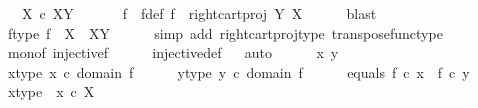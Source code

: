 \begin{isabellebody}
\ \ \ {\isachardoublequoteopen}X\ {\isasymle}\isactrlsub c\ X\isactrlbsup Y\isactrlesup {\isachardoublequoteclose}\isanewline
%
\isadelimproof
%
\endisadelimproof
%
\isatagproof
{}\isamarkupfalse%
\ {\isacharminus}{\kern0pt}\ \isanewline
\ \ \isamarkupfalse%
\ f\ \ f{\isacharunderscore}{\kern0pt}def{\isacharcolon}{\kern0pt}\ {\isachardoublequoteopen}f\ {\isacharequal}{\kern0pt}\ {\isacharparenleft}{\kern0pt}right{\isacharunderscore}{\kern0pt}cart{\isacharunderscore}{\kern0pt}proj\ Y\ X{\isacharparenright}{\kern0pt}\isactrlsup {\isasymsharp}{\isachardoublequoteclose}\isanewline
\ \ \ \ \isamarkupfalse%
\ blast\isanewline
\ \ \isamarkupfalse%
\ \isamarkupfalse%
\ f{\isacharunderscore}{\kern0pt}type{\isacharcolon}{\kern0pt}\ {\isachardoublequoteopen}f\ {\isacharcolon}{\kern0pt}\ X\ {\isasymrightarrow}\ X\isactrlbsup Y\isactrlesup {\isachardoublequoteclose}\isanewline
\ \ \ \ \isamarkupfalse%
\ {\isacharparenleft}{\kern0pt}simp\ add{\isacharcolon}{\kern0pt}\ right{\isacharunderscore}{\kern0pt}cart{\isacharunderscore}{\kern0pt}proj{\isacharunderscore}{\kern0pt}type\ transpose{\isacharunderscore}{\kern0pt}func{\isacharunderscore}{\kern0pt}type{\isacharparenright}{\kern0pt}\isanewline
\ \ \isamarkupfalse%
\ mono{\isacharunderscore}{\kern0pt}f{\isacharcolon}{\kern0pt}\ {\isachardoublequoteopen}injective{\isacharparenleft}{\kern0pt}f{\isacharparenright}{\kern0pt}{\isachardoublequoteclose}\isanewline
\ \ \ \ \isamarkupfalse%
\ injective{\isacharunderscore}{\kern0pt}def\isanewline
\ \ \isamarkupfalse%
{\isacharparenleft}{\kern0pt}auto{\isacharparenright}{\kern0pt}\isanewline
\ \ \ \ \isamarkupfalse%
\ x\ y\ \isanewline
\ \ \ \ \isamarkupfalse%
\ x{\isacharunderscore}{\kern0pt}type{\isacharcolon}{\kern0pt}\ {\isachardoublequoteopen}x\ {\isasymin}\isactrlsub c\ domain\ f{\isachardoublequoteclose}\isanewline
\ \ \ \ \isamarkupfalse%
\ y{\isacharunderscore}{\kern0pt}type{\isacharcolon}{\kern0pt}\ {\isachardoublequoteopen}y\ {\isasymin}\isactrlsub c\ domain\ f{\isachardoublequoteclose}\isanewline
\ \ \ \ \isamarkupfalse%
\ equals{\isacharcolon}{\kern0pt}\ {\isachardoublequoteopen}f\ {\isasymcirc}\isactrlsub c\ x\ {\isacharequal}{\kern0pt}\ f\ {\isasymcirc}\isactrlsub c\ y{\isachardoublequoteclose}\isanewline
\ \ \ \ \isamarkupfalse%
\ x{\isacharunderscore}{\kern0pt}type{}\ {\isacharcolon}{\kern0pt}\ {\isachardoublequoteopen}x\ {\isasymin}\isactrlsub c\ X{\isachardoublequoteclose}\isanewline

\end{isabellebody}
